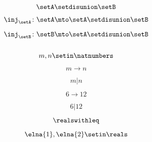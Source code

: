 {\begin{forslides}
        \begin{equation}
            \label{eq:parallelism-121}
            \setA \setdisunion \setB
        \end{equation}

        \begin{equation}
            \label{eq:parallelism-122}
            \inj_\setA\colon \setA\mto \setA \setdisunion\setB
        \end{equation}

        \begin{equation}
            \label{eq:parallelism-123}
            \inj_\setB\colon \setB\mto \setA \setdisunion\setB
        \end{equation}

        \begin{equation}
            \label{eq:parallelism-124}
        \end{equation}

        \begin{equation}
            \label{eq:parallelism-125}
            m,n\setin \natnumbers
        \end{equation}

        \begin{equation}
            \label{eq:parallelism-126}
            m\to n
        \end{equation}

        \begin{equation}
            \label{eq:parallelism-127}
            m | n
        \end{equation}

        \begin{equation}
            \label{eq:parallelism-128}
            6\to 12
        \end{equation}

        \begin{equation}
            \label{eq:parallelism-129}
            6 | 12
        \end{equation}

        \begin{equation}
            \label{eq:parallelism-130}
            \realswithleq
        \end{equation}

        \begin{equation}
            \label{eq:parallelism-131}
            \elna{1},\elna{2}\setin \reals
        \end{equation}


\end{forslides}}
